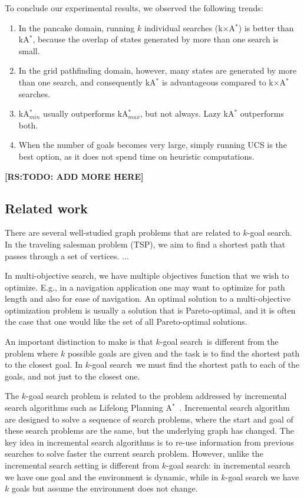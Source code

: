 \documentclass{aicom2e}
\newcommand{\kgs}{$k$-goal search}
\newcommand{\astar}{A$^*$}
\newcommand{\kastar}{kA$^*$}
\newcommand{\kastarmin}{kA$^*_{min}$}
\newcommand{\kastarmax}{kA$^*_{max}$}
\newcommand{\kxastar}{k$\times$A$^*$}
\newcommand{\roni}[1]{\textbf{[RS:#1]}}
\begin{document}
To conclude our experimental results, we observed the following trends:
\begin{enumerate}
	\item In the pancake domain, running $k$ individual searches (\kxastar{}) is better than \kastar{}, because the overlap of states generated by more than one search is small.
	\item In the grid pathfinding domain, however, many states are generated by more than one search, and consequently \kastar{} is advantageous compared to \kxastar{} searches. 
	\item \kastarmin{} usually outperforms \kastarmax{}, but not always. Lazy \kastar{} outperforms both. 
	\item When the number of goals becomes very large, simply running UCS is the best option, as it does not spend time on heuristic computations. 
\end{enumerate}

\roni{TODO: ADD MORE HERE}




\subsection{Related work}
\label{sec:related-work}

There are several well-studied graph problems that are related to $k$-goal search. In the traveling salesman problem (TSP), we aim to find a shortest path that passes through a set of vertices. 
...

In multi-objective search, we have multiple objectives function that we wish to optimize. E.g., in a navigation application one may want to optimize for path length and also for ease of navigation. An optimal 
solution to a multi-objective optimization problem is usually a solution that is Pareto-optimal, and it is often the case that one would like the set of all Pareto-optimal solutions. 


An important distinction to make is that \kgs\ is different from the problem where $k$ possible goals are given and the task is to find the shortest path to the closest goal. In \kgs\ we must find the shortest path to each of the goals, and not just to the closest one. 


The \kgs{} problem is related to the problem addressed by incremental search algorithms such as Lifelong Planning \astar{}~\cite{koenig2004lifelong}. Incremental search algorithm are designed to solve a sequence of search problems, where the start and goal of these search problems are the same, but the underlying graph has changed. The key idea in incremental search algorithms is to re-use information from previous searches to solve faster the current search problem. However, unlike the incremental search setting is different from \kgs{}: in incremental search we have one goal and the environment is dynamic, while in \kgs{} we have $k$ goals but assume the environment does not change. 
\end{document}
